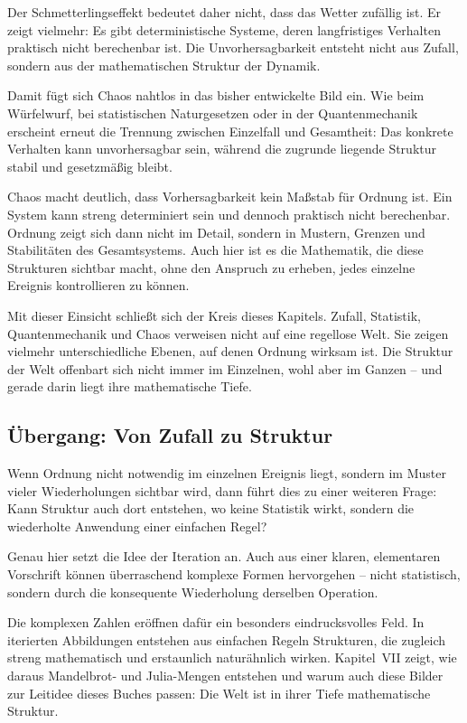 Der Schmetterlingseffekt bedeutet daher nicht,
dass das Wetter \glqq zufällig\grqq{} ist.
Er zeigt vielmehr:
Es gibt deterministische Systeme,
deren langfristiges Verhalten praktisch nicht berechenbar ist.
Die Unvorhersagbarkeit entsteht nicht aus Zufall,
sondern aus der mathematischen Struktur der Dynamik.

Damit fügt sich Chaos nahtlos
in das bisher entwickelte Bild ein.
Wie beim Würfelwurf,
bei statistischen Naturgesetzen
oder in der Quantenmechanik
erscheint erneut die Trennung
zwischen Einzelfall und Gesamtheit:
Das konkrete Verhalten kann unvorhersagbar sein,
während die zugrunde liegende Struktur
stabil und gesetzmäßig bleibt.

Chaos macht deutlich,
dass Vorhersagbarkeit kein Maßstab für Ordnung ist.
Ein System kann streng determiniert sein
und dennoch praktisch nicht berechenbar.
Ordnung zeigt sich dann nicht im Detail,
sondern in Mustern,
Grenzen
und Stabilitäten des Gesamtsystems.
Auch hier ist es die Mathematik,
die diese Strukturen sichtbar macht,
ohne den Anspruch zu erheben,
jedes einzelne Ereignis kontrollieren zu können.

Mit dieser Einsicht schließt sich der Kreis dieses Kapitels.
Zufall,
Statistik,
Quantenmechanik
und Chaos verweisen nicht auf eine regellose Welt.
Sie zeigen vielmehr unterschiedliche Ebenen,
auf denen Ordnung wirksam ist.
Die Struktur der Welt offenbart sich
nicht immer im Einzelnen,
wohl aber im Ganzen --
und gerade darin liegt ihre mathematische Tiefe.


\subsection*{Übergang: Von Zufall zu Struktur}

Wenn Ordnung nicht notwendig im einzelnen Ereignis liegt,
sondern im Muster vieler Wiederholungen sichtbar wird,
dann führt dies zu einer weiteren Frage:
Kann Struktur auch dort entstehen,
wo keine Statistik wirkt,
sondern die wiederholte Anwendung einer einfachen Regel?

Genau hier setzt die Idee der Iteration an.
Auch aus einer klaren, elementaren Vorschrift
können überraschend komplexe Formen hervorgehen --
nicht statistisch,
sondern durch die konsequente Wiederholung derselben Operation.

Die komplexen Zahlen eröffnen dafür ein besonders eindrucksvolles Feld.
In iterierten Abbildungen entstehen aus einfachen Regeln
Strukturen,
die zugleich streng mathematisch
und erstaunlich naturähnlich wirken.
Kapitel~VII zeigt,
wie daraus Mandelbrot- und Julia-Mengen entstehen
und warum auch diese Bilder
zur Leitidee dieses Buches passen:
Die Welt ist in ihrer Tiefe mathematische Struktur.
